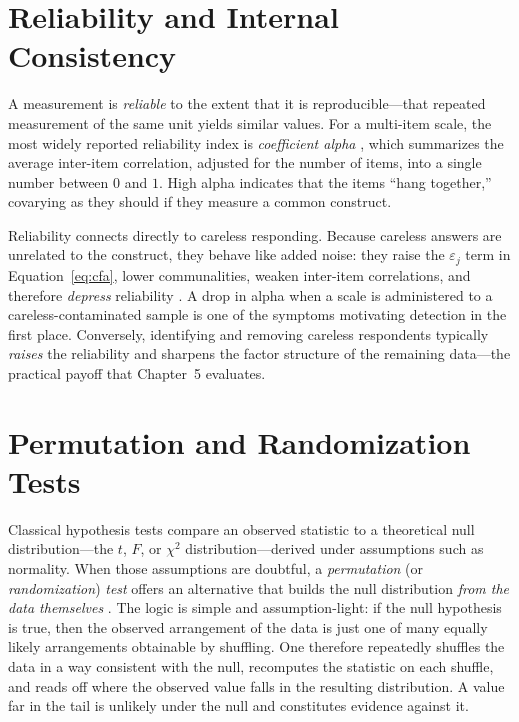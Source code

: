 \documentclass[doc,11pt,donotrepeattitle]{apa7}
\begin{document}
\section{Reliability and Internal Consistency}

A measurement is \emph{reliable} to the extent that it is reproducible---that
repeated measurement of the same unit yields similar values. For a multi-item
scale, the most widely reported reliability index is \emph{coefficient alpha}
\parencite{cronbach1951coefficient}, which summarizes the average inter-item
correlation, adjusted for the number of items, into a single number between
$0$ and $1$. High alpha indicates that the items ``hang together,'' covarying as
they should if they measure a common construct.

Reliability connects directly to careless responding. Because careless answers
are unrelated to the construct, they behave like added noise: they raise the
$\varepsilon_j$ term in Equation~\ref{eq:cfa}, lower communalities, weaken
inter-item correlations, and therefore \emph{depress} reliability
\parencite{huang2012detecting}. A drop in alpha when a scale is administered to
a careless-contaminated sample is one of the symptoms motivating detection in
the first place. Conversely, identifying and removing careless respondents
typically \emph{raises} the reliability and sharpens the factor structure of the
remaining data---the practical payoff that Chapter~5 evaluates.

\section{Permutation and Randomization Tests}
\label{sec:perm}

Classical hypothesis tests compare an observed statistic to a theoretical null
distribution---the $t$, $F$, or $\chi^2$ distribution---derived under
assumptions such as normality. When those assumptions are doubtful, a
\emph{permutation} (or \emph{randomization}) \emph{test} offers an alternative
that builds the null distribution \emph{from the data themselves}
\parencite{good2005permutation}. The logic is simple and assumption-light: if
the null hypothesis is true, then the observed arrangement of the data is just
one of many equally likely arrangements obtainable by shuffling. One therefore
repeatedly shuffles the data in a way consistent with the null, recomputes the
statistic on each shuffle, and reads off where the observed value falls in the
resulting distribution. A value far in the tail is unlikely under the null and
constitutes evidence against it.
\end{document}
